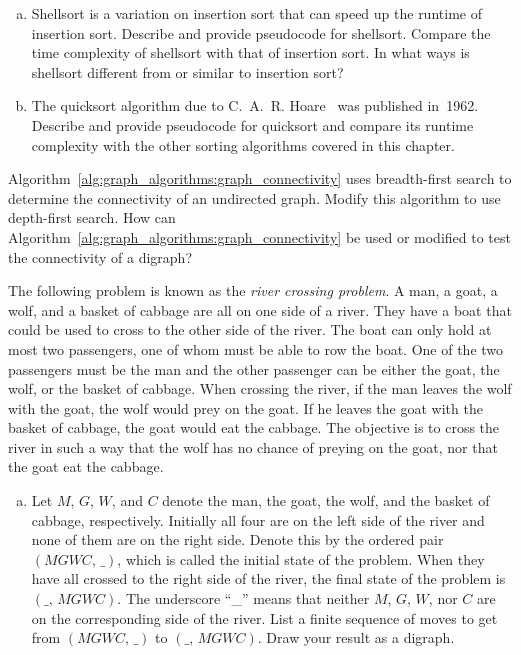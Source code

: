 \begin{problem}
\begin{enumerate}[(a)]
  \item Shellsort is a variation on
    insertion sort that can speed up the runtime
    of insertion sort. Describe and provide pseudocode for
    shellsort. Compare the time complexity of shellsort with that of
    insertion sort. In what ways is shellsort different from or
    similar to insertion sort?

  \item The quicksort algorithm due to C.~A.~R.
    Hoare~\cite{Hoare1962}
    was published in~1962. Describe and provide pseudocode for
    quicksort and compare its runtime complexity with the other
    sorting algorithms covered in this chapter.
  \end{enumerate}

\item\label{prob:graph_algorithms:connectivity_with_DFS_BFS}
  Algorithm~\ref{alg:graph_algorithms:graph_connectivity} uses
  breadth-first search to determine the
  connectivity of an undirected graph. Modify this algorithm to use
  depth-first search. How can
  Algorithm~\ref{alg:graph_algorithms:graph_connectivity} be used or
  modified to test the connectivity of a digraph?

\item The following problem is known as the
  \emph{river crossing problem}. A man,
  a goat, a wolf, and a basket of cabbage are all on one side of a
  river. They have a boat that could be used to cross to the other
  side of the river. The boat can only hold at most two passengers,
  one of whom must be able to row the boat. One of the two passengers
  must be the man and the other passenger can be either the goat, the
  wolf, or the basket of cabbage. When crossing the river, if the man
  leaves the wolf with the goat, the wolf would prey on the goat. If
  he leaves the goat with the basket of cabbage, the goat would eat
  the cabbage. The objective is to cross the river in such a way that
  the wolf has no chance of preying on the goat, nor that the goat eat
  the cabbage.
  \begin{enumerate}[(a)]
  \item Let $M$, $G$, $W$, and $C$ denote the man, the goat, the wolf,
    and the basket of cabbage, respectively. Initially all four are on
    the left side of the river and none of them are on the right
    side. Denote this by the ordered pair $(MGWC,\, \_)$, which is
    called the initial state of the problem. When
    they have all crossed to the right side of the river, the
    final state of the problem is $(\_,\, MGWC)$.
    The underscore ``\_'' means that neither $M$, $G$, $W$, nor $C$
    are on the corresponding side of the river. List a finite sequence
    of moves to get from $(MGWC,\, \_)$ to $(\_,\, MGWC)$. Draw your
    result as a digraph.


\end{enumerate}
\end{problem}
